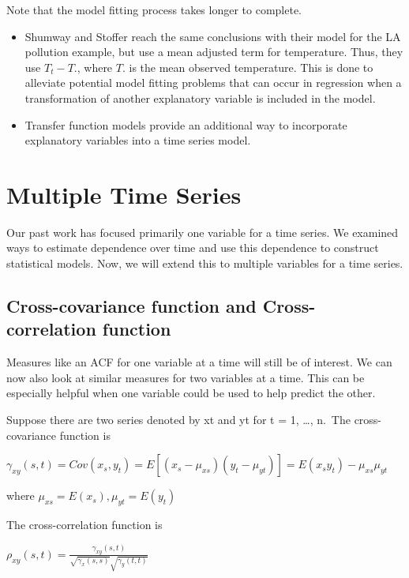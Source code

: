\documentclass[
]{book}
\theoremstyle{definition}
\theoremstyle{definition}
\theoremstyle{definition}
\theoremstyle{definition}
\theoremstyle{remark}
\begin{document}
Note that the model fitting process takes longer to complete.

\begin{itemize}
\item
  Shumway and Stoffer reach the same conclusions with their model for the LA pollution example, but use a mean adjusted term for temperature. Thus, they use \(T_t - T.\), where \(T.\) is the mean observed temperature. This is done to alleviate potential model fitting problems that can occur in regression when a transformation of another explanatory variable is included in the model.
\item
  Transfer function models provide an additional way to incorporate explanatory variables into a time series model.
\end{itemize}

\hypertarget{multiple-time-series}{%
\chapter{Multiple Time Series}\label{multiple-time-series}}

Our past work has focused primarily one variable for a time series. We examined ways to estimate dependence over time and use this dependence to construct statistical models. Now, we will extend this to multiple variables for a time series.

\hypertarget{cross-covariance-function-and-cross-correlation-function}{%
\section{Cross-covariance function and Cross-correlation function}\label{cross-covariance-function-and-cross-correlation-function}}

Measures like an ACF for one variable at a time will still be of interest. We can now also look at similar measures for two variables at a time. This can be especially helpful when one variable could be used to help predict the other.

Suppose there are two series denoted by xt and yt for t = 1, \ldots, n.~The cross-covariance function is

\(\gamma_{xy}(s,t)=Cov(x_s, y_t)=E[(x_s-\mu_{xs})(y_t-\mu_{yt})]=E(x_sy_t)-\mu_{xs}\mu_{yt}\)

where \(\mu_{xs}=E(x_s), \mu_{yt}=E(y_t)\)

The cross-correlation function is

\(\rho_{xy}(s,t)=\frac{\gamma_{xy}(s,t)}{\sqrt{\gamma_x(s,s)}\sqrt{\gamma_y(t,t)}}\)
\end{document}
